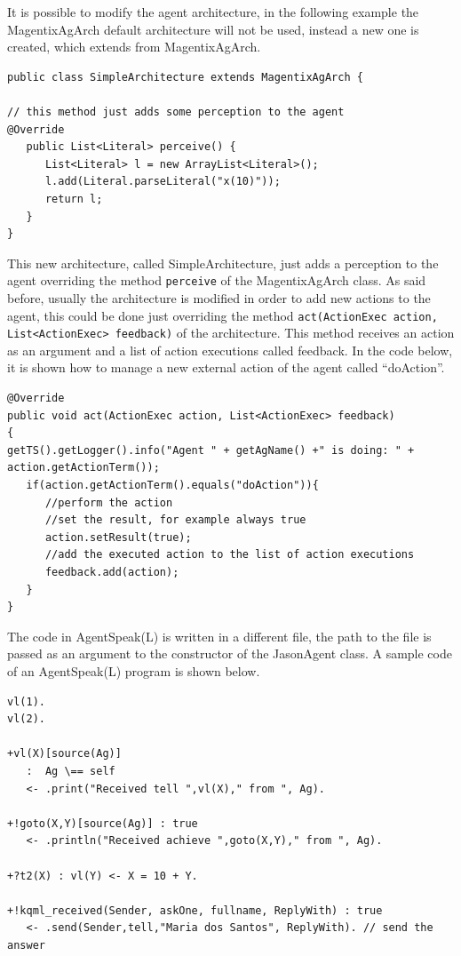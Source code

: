 It is possible to modify the agent architecture, in the following example the MagentixAgArch default architecture will not be used, instead a new one is created, which extends from MagentixAgArch.
\begin{lstlisting}[style=Java]
public class SimpleArchitecture extends MagentixAgArch {

// this method just adds some perception to the agent
@Override
   public List<Literal> perceive() {
      List<Literal> l = new ArrayList<Literal>();
      l.add(Literal.parseLiteral("x(10)"));
      return l;
   }
}
\end{lstlisting}
This new architecture, called SimpleArchitecture, just adds a perception to the agent overriding the method \texttt{perceive} of the MagentixAgArch class. As said before, usually the architecture is modified in order to add new actions to the agent, this could be done just overriding the method \texttt{act(ActionExec action, List<ActionExec> feedback)} of the architecture. This method receives an action as an argument and a list of action executions called feedback. In the code below, it is shown how to manage a new external action of the agent called ``doAction''.
\begin{lstlisting}[style=Java]
@Override
public void act(ActionExec action, List<ActionExec> feedback)
{
getTS().getLogger().info("Agent " + getAgName() +" is doing: " + action.getActionTerm());
   if(action.getActionTerm().equals("doAction")){
      //perform the action
      //set the result, for example always true
      action.setResult(true);
      //add the executed action to the list of action executions
      feedback.add(action);
   }
}
\end{lstlisting}

The code in AgentSpeak(L) is written in a different file, the path to the file is passed as an argument to the constructor of the JasonAgent class. A sample code of an AgentSpeak(L) program is shown below.
\begin{lstlisting}
vl(1).
vl(2).

+vl(X)[source(Ag)]
   :  Ag \== self
   <- .print("Received tell ",vl(X)," from ", Ag).

+!goto(X,Y)[source(Ag)] : true
   <- .println("Received achieve ",goto(X,Y)," from ", Ag).

+?t2(X) : vl(Y) <- X = 10 + Y.

+!kqml_received(Sender, askOne, fullname, ReplyWith) : true
   <- .send(Sender,tell,"Maria dos Santos", ReplyWith). // send the answer
\end{lstlisting}



